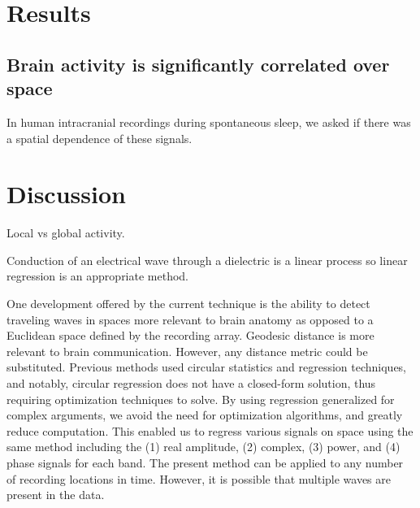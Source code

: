 
\section*{Results}
\subsection*{Brain activity is significantly correlated over space}
In human intracranial recordings during spontaneous sleep, we asked if there was a spatial dependence of these signals.

\section*{Discussion}
Local vs global activity.

Conduction of an electrical wave through a dielectric is a linear process so linear regression is an appropriate method.

One development offered by the current technique is the ability to detect traveling waves in spaces more relevant to brain anatomy as opposed to a Euclidean space defined by the recording array. Geodesic distance is more relevant to brain communication. However, any distance metric could be substituted.
Previous methods used circular statistics and regression techniques, and notably, circular regression does not have a closed-form solution, thus requiring optimization techniques to solve. By using regression generalized for complex arguments, we avoid the need for optimization algorithms, and greatly reduce computation. This enabled us to regress various signals on space using the same method including the (1) real amplitude, (2) complex, (3) power, and (4) phase signals for each band. The present method can be applied to any number of recording locations in time. However, it is possible that multiple waves are present in the data. 


